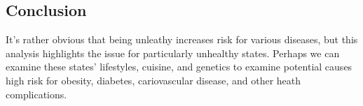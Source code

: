 \documentclass[11pt]{article}
\begin{document}
    \hypertarget{conclusion}{%
\subsection{Conclusion}\label{conclusion}}

It's rather obvious that being unleathy increases risk for various
diseases, but this analysis highlights the issue for particularly
unhealthy states. Perhaps we can examine these states' lifestyles,
cuisine, and genetics to examine potential causes high risk for obesity,
diabetes, cariovascular disease, and other heath complications.


    
    
    
    
\end{document}

